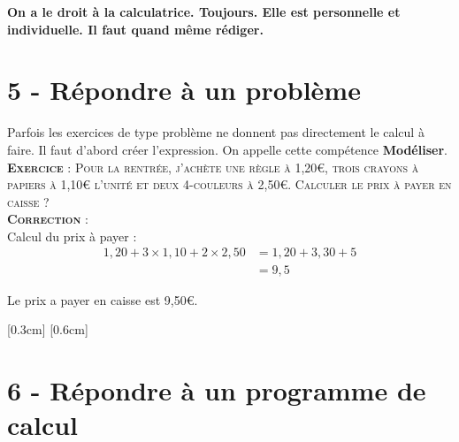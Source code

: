 \documentclass[11pt]{article}
\begin{document}
\textbf{On a le droit à la calculatrice. Toujours. Elle est personnelle et individuelle. Il faut quand même rédiger.}

\newpage

\section*{5 - Répondre à un problème}

Parfois les exercices de type problème ne donnent pas directement le calcul à faire. Il faut d'abord créer l'expression. On appelle cette compétence \textbf{Modéliser}.\\

\textsc{\textbf{Exercice} : Pour la rentrée, j'achète une règle à 1,20€, trois crayons à papiers à 1,10€ l'unité et deux 4-couleurs à 2,50€.} \newline
\textsc{Calculer le prix à payer en caisse ?}\\

\textsc{\textbf{Correction} :}\\

Calcul du prix à payer :
\begin{align*}
1,20 + 3 \times 1,10 + 2 \times 2,50 &= 1,20 + 3,30 + 5 \\
                                     &= 9,5
\end{align*}

Le prix a payer en caisse est 9,50€.



\begin{center}
\reversemarginpar\marginnote{$\Box \Box$}
\reversemarginpar\marginnote{$\Box \Box$}[0.3cm]
\reversemarginpar\marginnote{$\Box \Box$}[0.6cm]
\end{center}


\section*{6 - Répondre à un programme de calcul}
\end{document}
